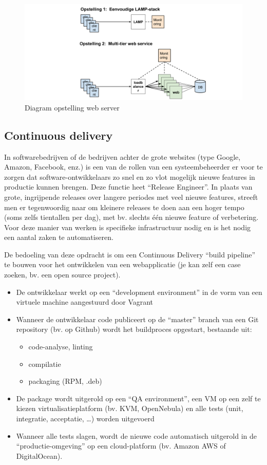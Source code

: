 \begin{figure}[htbp]
\centering
\includegraphics[width=\textwidth]{img/assignment-ha.png}
\caption{Diagram opstelling web server}
\end{figure}

\subsection{Continuous delivery}
\label{continuous-delivery}

In softwarebedrijven of de bedrijven achter de grote websites (type Google, Amazon, Facebook, enz.) is een van de rollen van een systeembeheerder er voor te zorgen dat software-ontwikkelaars zo snel en zo vlot mogelijk nieuwe features in productie kunnen brengen. Deze functie heet ``Release Engineer''. In plaats van grote, ingrijpende releases over langere periodes met veel nieuwe features, streeft men er tegenwoordig naar om kleinere releases te doen aan een hoger tempo (soms zelfs tientallen per dag), met bv. slechts één nieuwe feature of verbetering. Voor deze manier van werken is specifieke infrastructuur nodig en is het nodig een aantal zaken te automatiseren.

De bedoeling van deze opdracht is om een Continuous Delivery ``build pipeline'' te bouwen voor het ontwikkelen van een webapplicatie (je kan zelf een case zoeken, bv. een open source project).

\begin{itemize}
\item De ontwikkelaar werkt op een ``development environment'' in de vorm van een virtuele machine aangestuurd door Vagrant
\item Wanneer de ontwikkelaar code publiceert op de ``master'' branch van een Git repository (bv. op Github) wordt het buildproces opgestart, bestaande uit:

  \begin{itemize}
  \item code-analyse, linting
  \item compilatie
  \item packaging (RPM, .deb)
  \end{itemize}
\item De package wordt uitgerold op een ``QA environment'', een VM op een zelf te kiezen virtualisatieplatform (bv. KVM, OpenNebula) en alle tests (unit, integratie, acceptatie, \ldots{}) worden uitgevoerd
\item Wanneer alle tests slagen, wordt de nieuwe code automatisch uitgerold in de ``productie-omgeving'' op een cloud-platform (bv. Amazon AWS of DigitalOcean).
\end{itemize}

